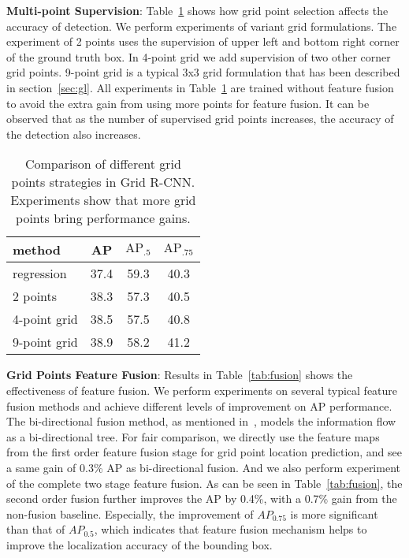 \documentclass[10pt,twocolumn,letterpaper]{article}
\begin{document}
\textbf{Multi-point Supervision}: Table~\ref{tab:density} shows how grid point selection affects the accuracy of detection. We perform experiments of variant grid formulations. The experiment of 2 points uses the supervision of upper left and bottom right corner of the ground truth box. In 4-point grid we add supervision of two other corner grid points. 9-point grid is a typical 3x3 grid formulation that has been described in section~\ref{sec:gl}. All experiments in Table~\ref{tab:density} are trained without feature fusion to avoid the extra gain from using more points for feature fusion. It can be observed that as the number of supervised grid points increases, the accuracy of the detection also increases.
\begin{table}[ht]
\begin{center}
\begin{tabular}{ l | c | c  c }
\hline
method & AP & $\text{AP}_{.5}$ & $\text{AP}_{.75}$ \\
\hline
regression  & 37.4 & 59.3 & 40.3 \\
2 points  & 38.3 & 57.3 & 40.5 \\
4-point grid  & 38.5 & 57.5 & 40.8 \\
9-point grid  & 38.9 & 58.2 & 41.2 \\
\hline
\end{tabular}
\vspace{1mm}
\caption{Comparison of different grid points strategies in Grid R-CNN. Experiments show that more grid points bring performance gains.}
\label{tab:density}
\vspace{-5mm}
\end{center}
\end{table}

\textbf{Grid Points Feature Fusion}: Results in Table~\ref{tab:fusion} shows the effectiveness of feature fusion. We perform experiments on several typical feature fusion methods and achieve different levels of improvement on AP performance. The bi-directional fusion method, as mentioned in~\cite{chu2016structured}, models the information flow as a bi-directional tree. 
For fair comparison, we directly use the feature maps from the first order feature fusion stage for grid point location prediction, and see a same gain of 0.3\% AP as bi-directional fusion. And we also perform experiment of the complete two stage feature fusion. As can be seen in Table~\ref{tab:fusion}, the second order fusion further improves the AP by 0.4\%, with a 0.7\% gain from the non-fusion baseline. Especially, the improvement of $AP_{0.75}$ is more significant than that of $AP_{0.5}$, which indicates that feature fusion mechanism helps to improve the localization accuracy of the bounding box.
\end{document}
